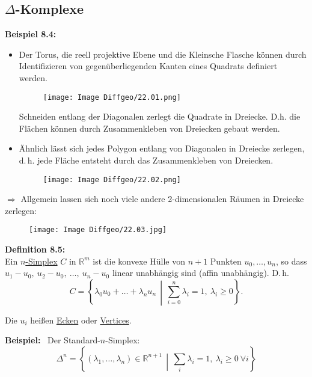 \documentclass[fleqn, 12pt, letterpaper]{article}
\begin{document}
\subsection{$\Delta$-Komplexe}
\textbf{Beispiel 8.4:} 
\begin{itemize}
    \item Der Torus, die reell projektive Ebene und die Kleinsche Flasche können durch Identifizieren von gegenüberliegenden Kanten eines Quadrats definiert werden.

\begin{figure}[H]
    \centering
    \texttt{[image: Image Diffgeo/22.01.png]}
 \end{figure}

Schneiden entlang der Diagonalen zerlegt die Quadrate in Dreiecke. D.h. die Flächen können durch Zusammenkleben von Dreiecken gebaut werden.


  \item Ähnlich lässt sich jedes Polygon entlang von Diagonalen in Dreiecke zerlegen, d.\,h. jede Fläche entsteht durch das Zusammenkleben von Dreiecken.
  \begin{figure}[H]
    \centering
    \texttt{[image: Image Diffgeo/22.02.png]}
 \end{figure}
\end{itemize}

$\Rightarrow$ Allgemein lassen sich noch viele andere 2-dimensionalen Räumen in Dreiecke zerlegen:

\begin{figure}[H]
    \centering
    \texttt{[image: Image Diffgeo/22.03.jpg]}
 \end{figure}

\textbf{Definition 8.5:}\\
Ein \underline{$n$-Simplex} $C$ in $\mathbb{R}^m$ ist die konvexe Hülle von $n+1$ Punkten $u_0, \dots, u_n$, so dass
\(
u_1 - u_0,\ u_2 - u_0,\ \dots,\ u_n - u_0\) { linear unabhängig sind} {(affin unabhängig)}.
D.\,h.
\[
C = \left\{ \lambda_0 u_0 + \dots + \lambda_n u_n \,\middle|\, \sum_{i=0}^n \lambda_i = 1,\ \lambda_i \geq 0 \right\}.
\]

Die $u_i$ heißen \underline{Ecken} oder \underline{Vertices}.

\vspace{1em}
\textbf{Beispiel:} \ Der Standard-$n$-Simplex:
\[
\Delta^n = \left\{ (\lambda_1, \dots, \lambda_n) \in \mathbb{R}^{n+1} \,\middle|\, \sum_i \lambda_i = 1,\ \lambda_i \geq 0 \ \forall i \right\}
\]
\end{document}
